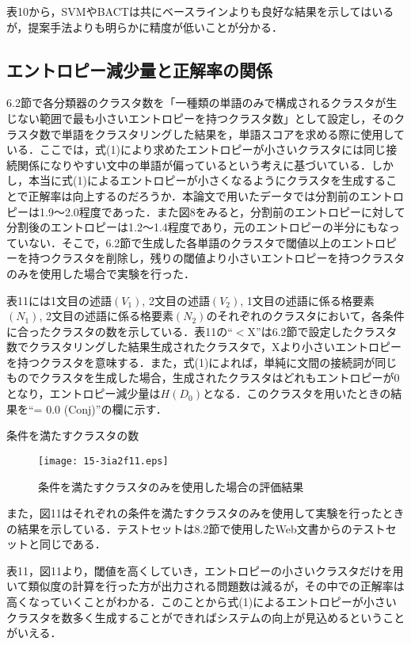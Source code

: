 \documentclass[japanese]{jnlp_1.4}
\begin{document}
表10から，SVMやBACTは共にベースラインよりも良好な結果を示してはいるが，提案手法よりも明らかに精度が低いことが分かる．

\subsection{エントロピー減少量と正解率の関係}

6.2節で各分類器のクラスタ数を「一種類の単語のみで構成されるクラスタが生じない範囲で最も小さいエントロピーを持つクラスタ数」として設定し，そのクラスタ数で単語をクラスタリングした結果を，単語スコアを求める際に使用している．ここでは，式(1)により求めたエントロピーが小さいクラスタには同じ接続関係になりやすい文中の単語が偏っているという考えに基づいている．しかし，本当に式(1)によるエントロピーが小さくなるようにクラスタを生成することで正解率は向上するのだろうか．本論文で用いたデータでは分割前のエントロピーは1.9〜2.0程度であった．また図8をみると，分割前のエントロピーに対して分割後のエントロピーは1.2〜1.4程度であり，元のエントロピーの半分にもなっていない．そこで，6.2節で生成した各単語のクラスタで閾値以上のエントロピーを持つクラスタを削除し，残りの閾値より小さいエントロピーを持つクラスタのみを使用した場合で実験を行った．

表11には1文目の述語$(V_{1})$, 2文目の述語$(V_{2})$, 1文目の述語に係る格要素$(N_{1})$, 2文目の述語に係る格要素$(N_{2})$のそれぞれのクラスタにおいて，各条件に合ったクラスタの数を示している．表11の``$<$X''は6.2節で設定したクラスタ数でクラスタリングした結果生成されたクラスタで，Xより小さいエントロピーを持つクラスタを意味する．また，式(1)によれば，単純に文間の接続詞が同じものでクラスタを生成した場合，生成されたクラスタはどれもエントロピーが0となり，エントロピー減少量は$H(D_{0})$となる．このクラスタを用いたときの結果を``= 0.0 (Conj)''の欄に示す．

\begin{table}[b]
\caption{条件を満たすクラスタの数}

\end{table}
\begin{figure}[b]
\centerline{\texttt{[image: 15-3ia2f11.eps]}}
\caption{条件を満たすクラスタのみを使用した場合の評価結果}
\end{figure}

また，図11はそれぞれの条件を満たすクラスタのみを使用して実験を行ったときの結果を示している．テストセットは8.2節で使用したWeb文書からのテストセットと同じである．

表11，図11より，閾値を高くしていき，エントロピーの小さいクラスタだけを用いて類似度の計算を行った方が出力される問題数は減るが，その中での正解率は高くなっていくことがわかる．このことから式(1)によるエントロピーが小さいクラスタを数多く生成することができればシステムの向上が見込めるということがいえる．
\end{document}
